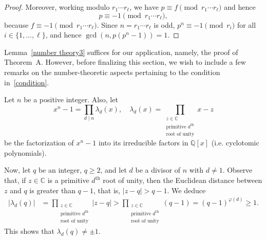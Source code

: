 \documentclass{amsart}
\begin{document}
\begin{proof}
Moreover, working modulo $r_1\cdots r_\ell$, we have $p\equiv f\pmod{r_1\cdots r_\ell}$ and hence
\begin{equation}\label{eq:number14}p\equiv -1\pmod{r_1\cdots r_\ell},\end{equation}
because $f\equiv -1\pmod{r_1\cdots r_\ell}$.
Since $n = r_1\cdots r_\ell$ is odd, $p^n\equiv -1\pmod {r_i}$ for all  $ i \in \{1, \ldots,  \ell \}$,  and hence
$\gcd(n, p(p^n-1))= 1$.
\end{proof}

Lemma~\ref{number theory3} suffices for our application, namely, the proof of Theorem~A. However, before finalizing this section, we wish to include a few remarks on the number-theoretic aspects pertaining to the condition in~\eqref{condition}.

Let $n$ be a positive integer. Also, let
$$x^n-1=\prod_{d\mid n}\lambda_d(x), \quad\lambda_d(x)=\prod_{\substack{z\in\mathbb{C}\\\textrm{primitive } d^{\mathrm{th}}\\ \textrm{root of unity}}}x-z$$
be the factorization of $x^n-1$ into its irreducible factors in $\mathbb{Q}[x]$ (i.e. cyclotomic polynomials). 

Now, let $q$ be an integer, $q \geq 2$, and let $d$ be a divisor of $n$ with $d\ne 1$. Observe that, if $z\in \mathbb{C}$ is a primitive $d^{\textrm{th}}$ root of unity, then the Euclidean distance between $z$ and $q$ is greater than $q-1$, that is, $|z-q|>q -1$.  We deduce
\begin{align*}
|\lambda_d(q)|&=\prod_{\substack{z\in\mathbb{C}\\\textrm{primitive } d^{\mathrm{th}}\\ \textrm{root of unity}}}|z-q| > \prod_{\substack{z\in\mathbb{C}\\\textrm{primitive } d^{\mathrm{th}}\\ \textrm{root of unity}}}(q-1) = (q-1)^{\varphi(d)}\ge 1.
\end{align*}
This shows that $\lambda_d(q)\ne\pm 1$.
\end{document}

